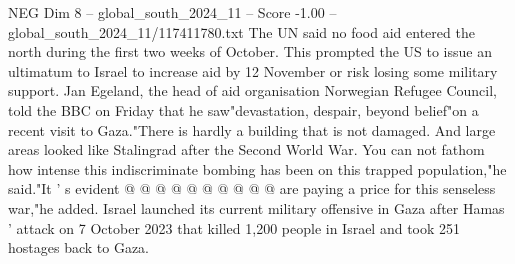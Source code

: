 \begin{textsample}{NEG Dim 8 – global\_south\_2024\_11 – Score -1.00 – global\_south\_2024\_11/117411780.txt}
The UN said no food aid entered the north during the first two weeks of October.
This prompted the US to issue an ultimatum to Israel to increase aid by 12 November or risk losing some military support.
Jan Egeland, the head of aid organisation Norwegian Refugee Council, told the BBC on Friday that he saw"devastation, despair, beyond belief"on a recent visit to Gaza."There is hardly a building that is not damaged.
And large areas looked like Stalingrad after the Second World War.
You can not fathom how intense this indiscriminate bombing has been on this trapped population,"he said."It ' s evident @ @ @ @ @ @ @ @ @ @ are paying a price for this senseless war,"he added.
Israel launched its current military offensive in Gaza after Hamas ' attack on 7 October 2023 that killed 1,200 people in Israel and took 251 hostages back to Gaza.

\end{textsample}
